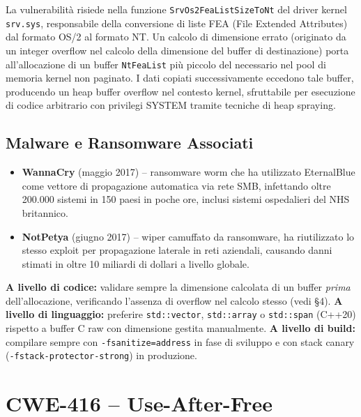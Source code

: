 \documentclass[11pt,a4paper]{article}
\begin{document}
La vulnerabilità risiede nella funzione \texttt{SrvOs2FeaListSizeToNt} del driver kernel \texttt{srv.sys}, responsabile della conversione di liste FEA (File Extended Attributes) dal formato OS/2 al formato NT. Un calcolo di dimensione errato (originato da un integer overflow nel calcolo della dimensione del buffer di destinazione) porta all'allocazione di un buffer \texttt{NtFeaList} più piccolo del necessario nel pool di memoria kernel non paginato. I dati copiati successivamente eccedono tale buffer, producendo un heap buffer overflow nel contesto kernel, sfruttabile per esecuzione di codice arbitrario con privilegi SYSTEM tramite tecniche di heap spraying.

\subsection{Malware e Ransomware Associati}

\begin{itemize}[leftmargin=*]
    \item \textbf{WannaCry} (maggio 2017) -- ransomware worm che ha utilizzato EternalBlue come vettore di propagazione automatica via rete SMB, infettando oltre 200.000 sistemi in 150 paesi in poche ore, inclusi sistemi ospedalieri del NHS britannico.
    \item \textbf{NotPetya} (giugno 2017) -- wiper camuffato da ransomware, ha riutilizzato lo stesso exploit per propagazione laterale in reti aziendali, causando danni stimati in oltre 10 miliardi di dollari a livello globale.
\end{itemize}

\begin{mitigationbox}
\textbf{A livello di codice:} validare sempre la dimensione calcolata di un buffer \emph{prima} dell'allocazione, verificando l'assenza di overflow nel calcolo stesso (vedi \S4). \textbf{A livello di linguaggio:} preferire \texttt{std::vector}, \texttt{std::array} o \texttt{std::span} (C++20) rispetto a buffer C raw con dimensione gestita manualmente. \textbf{A livello di build:} compilare sempre con \texttt{-fsanitize=address} in fase di sviluppo e con stack canary (\texttt{-fstack-protector-strong}) in produzione.
\end{mitigationbox}

\section{CWE-416 -- Use-After-Free}
\end{document}
